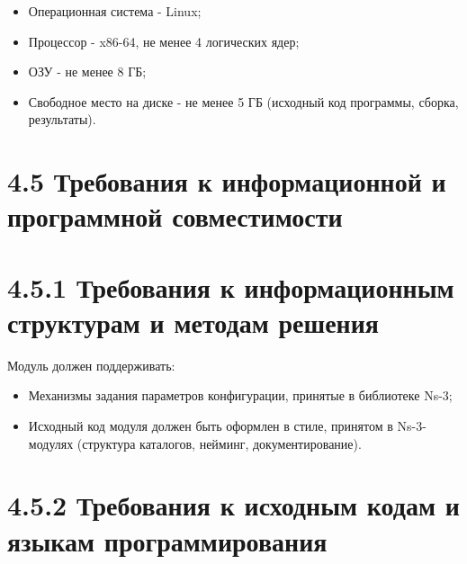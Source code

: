 \begin{itemize}
\item
  Операционная система - Linux;
\item
  Процессор - x86-64, не менее 4 логических ядер;
\item
  ОЗУ - не менее 8 ГБ;
\item
  Свободное место на диске - не менее 5 ГБ (исходный код программы,
  сборка, результаты).
\end{itemize}

\section{4.5 Требования к информационной и программной
совместимости}\label{ux442ux440ux435ux431ux43eux432ux430ux43dux438ux44f-ux43a-ux438ux43dux444ux43eux440ux43cux430ux446ux438ux43eux43dux43dux43eux439-ux438-ux43fux440ux43eux433ux440ux430ux43cux43cux43dux43eux439-ux441ux43eux432ux43cux435ux441ux442ux438ux43cux43eux441ux442ux438}

\section{4.5.1 Требования к информационным структурам и методам
решения}\label{ux442ux440ux435ux431ux43eux432ux430ux43dux438ux44f-ux43a-ux438ux43dux444ux43eux440ux43cux430ux446ux438ux43eux43dux43dux44bux43c-ux441ux442ux440ux443ux43aux442ux443ux440ux430ux43c-ux438-ux43cux435ux442ux43eux434ux430ux43c-ux440ux435ux448ux435ux43dux438ux44f}

Модуль должен поддерживать:

\begin{itemize}
\item
  Механизмы задания параметров конфигурации, принятые в библиотеке Ns-3;
\item
  Исходный код модуля должен быть оформлен в стиле, принятом в
  Ns-3-модулях (структура каталогов, нейминг, документирование).
\end{itemize}

\section{4.5.2 Требования к исходным кодам и языкам
программирования}\label{ux442ux440ux435ux431ux43eux432ux430ux43dux438ux44f-ux43a-ux438ux441ux445ux43eux434ux43dux44bux43c-ux43aux43eux434ux430ux43c-ux438-ux44fux437ux44bux43aux430ux43c-ux43fux440ux43eux433ux440ux430ux43cux43cux438ux440ux43eux432ux430ux43dux438ux44f}

